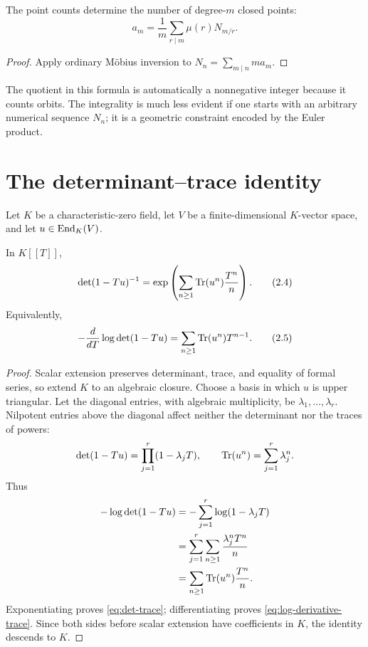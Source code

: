 \begin{corollary}
\label{cor:mobius-closed-points}
The point counts determine the number of degree-\(m\) closed points:
\[
 a_m=\frac1m\sum_{r\mid m}\mu(r)N_{m/r}.
\]
\end{corollary}

\begin{proof}
Apply ordinary M\"obius inversion to
\(N_n=\sum_{m\mid n}ma_m\).
\end{proof}

The quotient in this formula is automatically a nonnegative integer
because it counts orbits.  The integrality is much less evident if one
starts with an arbitrary numerical sequence \(N_n\); it is a geometric
constraint encoded by the Euler product.

\section{The determinant--trace identity}

Let \(K\) be a characteristic-zero field, let \(V\) be a
finite-dimensional \(K\)-vector space, and let \(u\in\operatorname{End}_K(V)\).

\begin{theorem}
\label{prop:det-trace}
In \(K[[T]]\),
\[
 \det(1-Tu)^{-1}
 =\exp\left(\sum_{n\geq1}\operatorname{Tr}(u^n)\frac{T^n}{n}\right).
 \tag{2.4}\label{eq:det-trace}
\]
Equivalently,
\[
 -\frac{d}{dT}\log\det(1-Tu)
 =\sum_{n\geq1}\operatorname{Tr}(u^n)T^{n-1}.
 \tag{2.5}\label{eq:log-derivative-trace}
\]
\end{theorem}

\begin{proof}
Scalar extension preserves determinant, trace, and equality of formal
series, so extend \(K\) to an algebraic closure.  Choose a basis in which
\(u\) is upper triangular.  Let the diagonal entries, with algebraic
multiplicity, be \(\lambda_1,\ldots,\lambda_r\).  Nilpotent entries above
the diagonal affect neither the determinant nor the traces of powers:
\[
 \det(1-Tu)=\prod_{j=1}^r(1-\lambda_jT),\qquad
 \operatorname{Tr}(u^n)=\sum_{j=1}^r\lambda_j^n.
\]
Thus
\[
\begin{aligned}
 -\log\det(1-Tu)
 &=-\sum_{j=1}^r\log(1-\lambda_jT)\\
 &=\sum_{j=1}^r\sum_{n\geq1}
       \frac{\lambda_j^nT^n}{n}\\
 &=\sum_{n\geq1}\operatorname{Tr}(u^n)\frac{T^n}{n}.
\end{aligned}
\]
Exponentiating proves \eqref{eq:det-trace}; differentiating proves
\eqref{eq:log-derivative-trace}.  Since both sides before scalar
extension have coefficients in \(K\), the identity descends to \(K\).
\end{proof}

